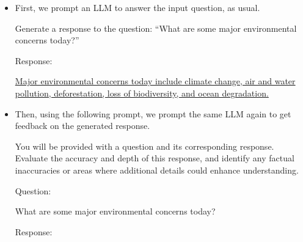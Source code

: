 \begin{itemize}
\item \vspace{0.5em} First, we prompt an LLM to answer the input question, as usual.

\vspace{0.5em}
\begin{tcolorbox}

\begingroup
\setlength{\leftskip}{2em}
\setlength{\rightskip}{2em}

Generate a response to the question: ``What are some major environmental concerns today?''

\vspace{0.5em}

Response:

\vspace{0.2em}

\uline{Major environmental concerns today include climate change, air and water pollution, deforestation, loss of biodiversity, and ocean degradation.}

\endgroup

\end{tcolorbox}
\vspace{0.5em}

\item Then, using the following prompt, we prompt the same LLM again to get feedback on the generated response.

\vspace{0.5em}
\begin{tcolorbox}

\begingroup
\setlength{\leftskip}{2em}
\setlength{\rightskip}{2em}

You will be provided with a question and its corresponding response. Evaluate the accuracy and depth of this response, and identify any factual inaccuracies or areas where additional details could enhance understanding.

\vspace{0.5em}

Question:

\vspace{0.2em}

What are some major environmental concerns today?

\vspace{0.5em}

Response:

\vspace{0.2em}


\end{tcolorbox}
\end{itemize}
